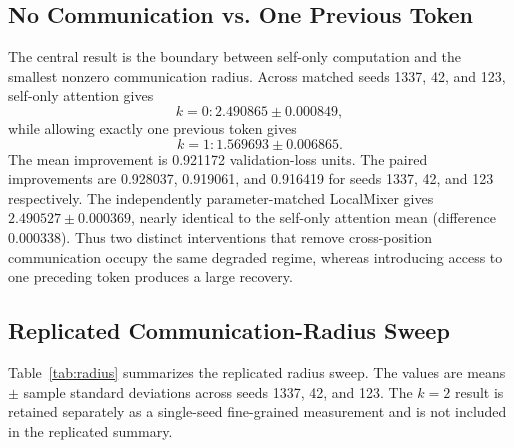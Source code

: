 \documentclass[11pt]{article}
\begin{document}
\subsection{No Communication vs. One Previous Token}
The central result is the boundary between self-only computation and the smallest nonzero communication radius. Across matched seeds 1337, 42, and 123, self-only attention gives
\begin{equation}
\boxed{k=0: 2.490865 \pm 0.000849},
\end{equation}
while allowing exactly one previous token gives
\begin{equation}
\boxed{k=1: 1.569693 \pm 0.006865}.
\end{equation}
The mean improvement is 0.921172 validation-loss units. The paired improvements are 0.928037, 0.919061, and 0.916419 for seeds 1337, 42, and 123 respectively. The independently parameter-matched LocalMixer gives $2.490527 \pm 0.000369$, nearly identical to the self-only attention mean (difference 0.000338). Thus two distinct interventions that remove cross-position communication occupy the same degraded regime, whereas introducing access to one preceding token produces a large recovery.

\subsection{Replicated Communication-Radius Sweep}
Table~\ref{tab:radius} summarizes the replicated radius sweep. The values are means $\pm$ sample standard deviations across seeds 1337, 42, and 123. The $k=2$ result is retained separately as a single-seed fine-grained measurement and is not included in the replicated summary.
\end{document}
